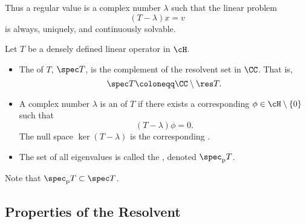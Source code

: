 \documentclass[oneside,reqno,letterpaper]{amsart}
\newcommand{\pspec}{\spec_{\mathrm{p}}}
\begin{document}
Thus a regular value is a complex number \(\lambda\) such that the linear problem 
\[
  (T - \lambda) x = v
\]
is always, uniquely, and continuously solvable. 


\begin{definition}
  Let \(T\) be a densely defined linear operator in \(\cH\). 
  \begin{itemize}
    \item The  of \(T\), \(\spec T\), is the complement of the resolvent set in \(\CC\). 
      That is, 
      \[
        \spec T \coloneqq \CC \setminus \res T . 
      \]
    \item A complex number \(\lambda\) is an  of \(T\) if there exists a corresponding  \(\phi \in \cH \setminus \{0\}\) such that 
      \[
        (T - \lambda) \phi = 0 . 
      \] 
      The null space \(\ker(T - \lambda)\) is the corresponding . 
    \item The set of all eigenvalues is called the , denoted \(\pspec T\). 
  \end{itemize}
\end{definition}
Note that \(\pspec T \subset \spec T\). 


\subsection{Properties of the Resolvent}
\end{document}
